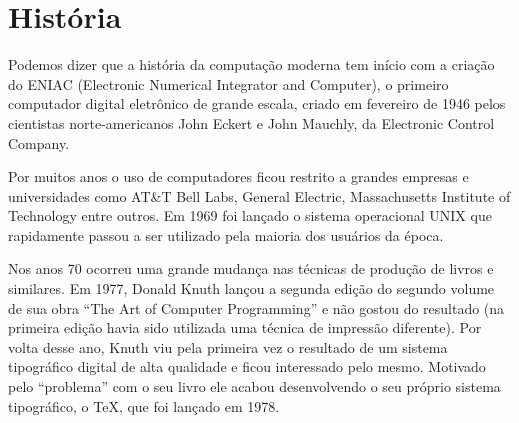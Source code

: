 % 
% 
% 
% 
% 
% 
%
%
\chapter{Hist\'{o}ria} \label{sch:history}
Podemos dizer que a hist\'{o}ria da computa\c{c}\~{a}o moderna tem in\'{i}cio com a cria\c{c}\~{a}o do ENIAC (Electronic Numerical Integrator and Computer), o primeiro computador digital eletr\^{o}nico de grande escala, criado em fevereiro de 1946 pelos cientistas norte-americanos John Eckert e John Mauchly, da Electronic Control Company.\nocite{Wikipedia:PT:ENIAC}

Por muitos anos o uso de computadores ficou restrito a grandes empresas e universidades como AT\&T Bell Labs, General Electric, Massachusetts Institute of Technology entre outros. Em 1969 foi lan\c{c}ado o sistema operacional UNIX que rapidamente passou a ser utilizado pela maioria dos usu\'{a}rios da \'{e}poca.\nocite{Wikipedia:EN:UNIX}

Nos anos 70 ocorreu uma grande mudan\c{c}a nas t\'{e}cnicas de produ\c{c}\~{a}o de livros e similares. Em 1977, Donald Knuth lan\c{c}ou a segunda edi\c{c}\~{a}o do segundo volume de sua obra ``The Art of Computer Programming'' e n\~{a}o gostou do resultado (na primeira edi\c{c}\~{a}o havia sido utilizada uma t\'{e}cnica de impress\~{a}o diferente). Por volta desse ano, Knuth viu pela primeira vez o resultado de um sistema tipogr\'{a}fico digital de alta qualidade e ficou interessado pelo mesmo. Motivado pelo ``problema'' com o seu livro ele acabou desenvolvendo o seu pr\'{o}prio sistema tipogr\'{a}fico, o TeX, que foi lan\c{c}ado em 1978.\nocite{Wikipedia:EN:TeX}

